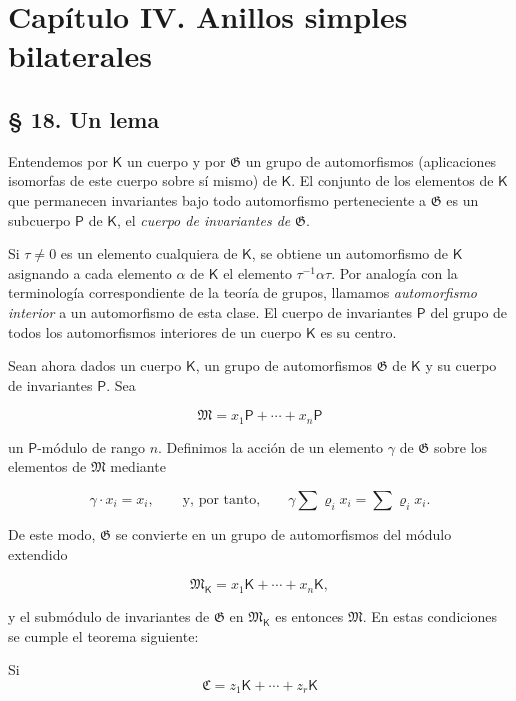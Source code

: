 \section*{Capítulo IV. Anillos simples bilaterales}\label{capitulo-iv-anillos-simples-bilaterales}

\subsection*{§ 18. Un lema}\label{un-lema}

Entendemos por \(\mathsf K\) un cuerpo y por \(\mathfrak G\) un grupo de automorfismos (aplicaciones isomorfas de este cuerpo sobre sí mismo) de \(\mathsf K\). El conjunto de los elementos de \(\mathsf K\) que permanecen invariantes bajo todo automorfismo perteneciente a \(\mathfrak G\) es un subcuerpo \(\mathsf P\) de \(\mathsf K\), el \emph{cuerpo de invariantes de} \(\mathfrak G\).

Si \(\tau\ne 0\) es un elemento cualquiera de \(\mathsf K\), se obtiene un automorfismo de \(\mathsf K\) asignando a cada elemento \(\alpha\) de \(\mathsf K\) el elemento \(\tau^{-1}\alpha\tau\). Por analogía con la terminología correspondiente de la teoría de grupos, llamamos \emph{automorfismo interior} a un automorfismo de esta clase. El cuerpo de invariantes \(\mathsf P\) del grupo de todos los automorfismos interiores de un cuerpo \(\mathsf K\) es su centro.

Sean ahora dados un cuerpo \(\mathsf K\), un grupo de automorfismos \(\mathfrak G\) de \(\mathsf K\) y su cuerpo de invariantes \(\mathsf P\). Sea

\[
\mathfrak M=x_1\mathsf P+\cdots+x_n\mathsf P
\]

un \(\mathsf P\)-módulo de rango \(n\). Definimos la acción de un elemento \(\gamma\) de \(\mathfrak G\) sobre los elementos de \(\mathfrak M\) mediante

\[
\gamma\cdot x_i=x_i,\qquad\text{y, por tanto,}\qquad
\gamma\sum \varrho_i x_i=\sum \varrho_i x_i.
\]

De este modo, \(\mathfrak G\) se convierte en un grupo de automorfismos del módulo extendido

\[
\mathfrak M_{\mathsf K}=x_1\mathsf K+\cdots+x_n\mathsf K,
\]

y el submódulo de invariantes de \(\mathfrak G\) en \(\mathfrak M_{\mathsf K}\) es entonces \(\mathfrak M\). En estas condiciones se cumple el teorema siguiente:

Si
\[
\mathfrak C=z_1\mathsf K+\cdots+z_r\mathsf K
\]

